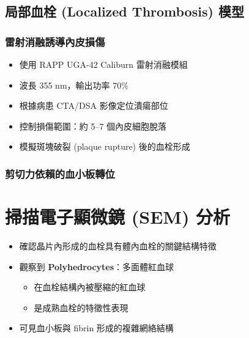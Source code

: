 \documentclass[12pt,a4paper]{article}
\begin{document}
\subsection{局部血栓 (Localized Thrombosis) 模型}

\subsubsection{雷射消融誘導內皮損傷}

\begin{itemize}
    \item 使用 RAPP UGA-42 Caliburn 雷射消融模組
    \item 波長 355 nm，輸出功率 70\%
    \item 根據病患 CTA/DSA 影像定位潰瘍部位
    \item 控制損傷範圍：約 5--7 個內皮細胞脫落
    \item 模擬斑塊破裂 (plaque rupture) 後的血栓形成
\end{itemize}

\subsubsection{剪切力依賴的血小板轉位}


\section{掃描電子顯微鏡 (SEM) 分析}

\begin{itemize}
    \item 確認晶片內形成的血栓具有體內血栓的關鍵結構特徵
    \item 觀察到 \textbf{Polyhedrocytes}：多面體紅血球
    \begin{itemize}
        \item 在血栓結構內被壓縮的紅血球
        \item 是成熟血栓的特徵性表現
    \end{itemize}
    \item 可見血小板與 fibrin 形成的複雜網絡結構
\end{itemize}
\end{document}
